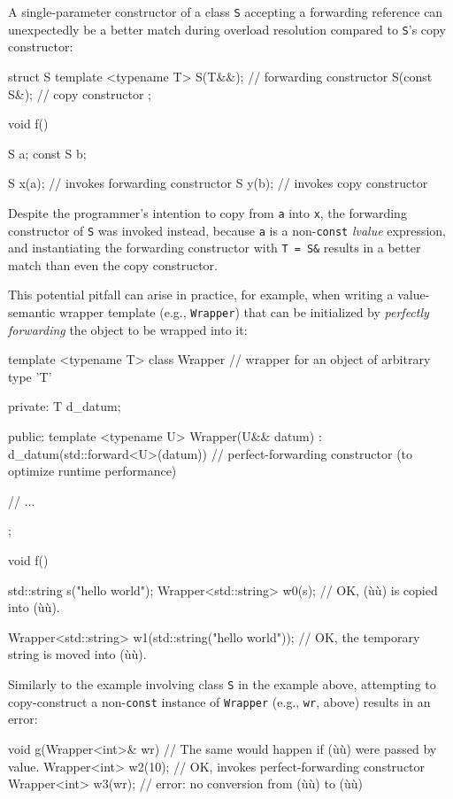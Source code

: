 A single-parameter constructor of a class \texttt{S} accepting a
forwarding reference can unexpectedly be a better match during overload
resolution compared to \texttt{S}'s copy constructor:

\begin{emcppslisting}
struct S
{
    template <typename T> S(T&&);  // forwarding constructor
    S(const S&);                   // copy constructor
};

void f()
{
    S a;
    const S b;

    S x(a);  // invokes forwarding constructor
    S y(b);  // invokes copy constructor
}
\end{emcppslisting}

\noindent Despite the programmer's intention to copy from \texttt{a} into
\texttt{x}, the forwarding constructor of \texttt{S} was invoked
instead, because \texttt{a} is a non-\texttt{const} \emph{lvalue}
expression, and instantiating the forwarding constructor with
\texttt{T}~\texttt{=}~\texttt{S\&} results in a better match than even
the copy constructor.

This potential pitfall can arise in practice, for example, when writing
a value-semantic wrapper template (e.g., \texttt{Wrapper}) that can be
initialized by \textit{perfectly forwarding} the object to be wrapped into it:

\begin{emcppslisting}
template <typename T>
class Wrapper  // wrapper for an object of arbitrary type 'T'
{
private:
    T d_datum;

public:
    template <typename U>
    Wrapper(U&& datum) : d_datum(std::forward<U>(datum)) { }
        // perfect-forwarding constructor (to optimize runtime performance)

    // ...
};

void f()
{
    std::string s("hello world");
    Wrapper<std::string> w0(s);  // OK, (ù{}ù) is copied into (ù{}ù).

    Wrapper<std::string> w1(std::string("hello world"));
        // OK, the temporary string is moved into (ù{}ù).
}
\end{emcppslisting}

\noindent Similarly to the example involving class \texttt{S} in the example above, attempting
to copy-construct a non-\texttt{const} instance of \texttt{Wrapper}
(e.g., \texttt{wr}, above) results in an error:

\begin{emcppslisting}
void g(Wrapper<int>& wr)  // The same would happen if (ù{}ù) were passed by value.
{
    Wrapper<int> w2(10);  // OK, invokes perfect-forwarding constructor
    Wrapper<int> w3(wr);  // error: no conversion from (ù{}ù) to (ù{}ù)
}
\end{emcppslisting}

